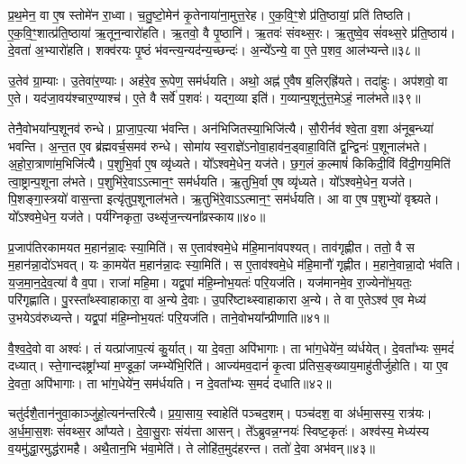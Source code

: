 प्र॒थ॒मेन॒ वा ए॒ष स्तोमे॑न रा॒ध्वा।
च॒तु॒ष्टो॒मेन॑ कृ॒तेनाया॑ना॒मुत्त॒रेह\sn{}।
ए॒क॒वि॒ꣳ॒शे प्र॑ति॒ष्ठायां॒ प्रति॑ तिष्ठति।
ए॒क॒वि॒ꣳ॒शात्प्र॑ति॒ष्ठाया॑ ऋ॒तून॒न्वारो॑हति।
ऋ॒तवो॒ वै पृ॒ष्ठानि॑।
ऋ॒तवः॑ संवथ्स॒रः।
ऋ॒तुष्वे॒व सं॑वथ्स॒रे प्र॑ति॒ष्ठाय॑।
दे॒वता॑ अ॒भ्यारो॑हति।
शक्व॑रयः पृ॒ष्ठं भ॑वन्त्य॒न्यद॑न्य॒च्छन्दः॑।
अ॒न्ये᳚\-ऽन्ये॒ वा ए॒ते प॒शव॒ आल॑भ्यन्ते॥३८॥

उ॒तेव॑ ग्रा॒म्याः।
उ॒तेवा॑र॒ण्याः।
अह॑रे॒व रू॒पेण॒ सम॑र्धयति।
अथो॒ अह्न॑ ए॒वैष ब॒लिर्‌\mbox{}ह्रि॑यते।
तदा॑हुः।
अप॑शवो॒ वा ए॒ते।
यद॑जा॒वय॑श्चार॒ण्याश्च॑।
ए॒ते वै सर्वे॑ प॒शवः॑।
यद्ग॒व्या इति॑।
ग॒व्यान्प॒शूनु॑त्त॒मेऽहं॒ नाल॑भते॥३९॥

तेनै॒वोभया᳚न्प॒शूनव॑ रुन्धे।
प्रा॒जा॒प॒त्या भ॑वन्ति।
अन॑भिजितस्या॒भिजि॑त्यै।
सौ॒रीर्नव॑ श्वे॒ता व॒शा अ॑नूब॒न्ध्या॑ भवन्ति।
अ॒न्त॒त ए॒व ब्र॑ह्मवर्च॒समव॑ रुन्धे।
सोमा॑य स्व॒राज्ञे॑\-ऽनोवा॒हाव॑न॒ड्वाहा॒विति॑ द्व॒न्द्विनः॑ प॒शूनाल॑भते।
अ॒हो॒रा॒त्राणा॑म॒भिजि॑त्यै।
प॒शुभि॒र्वा ए॒ष व्यृ॑ध्यते।
यो᳚ऽश्वमे॒धेन॒ यज॑ते।
छ॒ग॒लं क॒ल्माषं॑ किकिदी॒विं वि॑दी॒गय॒मिति॑ त्वा॒ष्ट्रान्प॒शूना ल॑भते।
प॒शुभि॑रे॒वाऽऽत्मान॒ꣳ॒ सम॑र्धयति।
ऋ॒तुभि॒र्वा ए॒ष व्यृ॑ध्यते।
यो᳚ऽश्वमे॒धेन॒ यज॑ते।
पि॒शङ्गा॒स्त्रयो॑ वास॒न्ता इत्यृ॑तुप॒शूनाल॑भते।
ऋ॒तुभि॑रे॒वाऽऽत्मान॒ꣳ॒ सम॑र्धयति।
आ वा ए॒ष प॒शुभ्यो॑ वृश्च्यते।
यो᳚ऽश्वमे॒धेन॒ यज॑ते।
पर्य॑ग्निकृता॒ उथ्सृ॑ज॒न्त्यना᳚व्रस्काय॥४०॥\anuvakamend[ल॒भ्य॒न्ते॒ ल॒भ॒ते॒ त्वा॒ष्ट्रान्प॒शूनाल॑भते॒\-ऽष्टौ च॑]

प्र॒जाप॑तिरकामयत म॒हान॑न्ना॒दः स्या॒मिति॑।
स ए॒ताव॑श्वमे॒धे म॑हि॒माना॑वपश्यत्।
ताव॑गृह्णीत।
ततो॒ वै स म॒हान॑न्ना॒दो॑\-ऽभवत्।
यः का॒मये॑त म॒हान॑न्ना॒दः स्या॒मिति॑।
स ए॒ताव॑श्वमे॒धे म॑हि॒मानौ॑ गृह्णीत।
म॒हाने॒वान्ना॒दो भ॑वति।
य॒ज॒मा॒न॒दे॒व॒त्या॑ वै व॒पा।
राजा॑ महि॒मा।
यद्व॒पां म॑हि॒म्नोभ॒यतः॑ परि॒यज॑ति।
यज॑मानमे॒व रा॒ज्येनो॑भ॒यतः॒ परि॑गृह्णाति।
पु॒रस्ता᳚थ्स्वाहाकारा॒ वा अ॒न्ये दे॒वाः।
उ॒परि॑ष्टाथ्स्वाहाकारा अ॒न्ये।
ते वा ए॒ते\-ऽश्व॑ ए॒व मेध्य॑ उ॒भये\-ऽव॑रुध्यन्ते।
यद्व॒पां म॑हि॒म्नोभ॒यतः॑ परि॒यज॑ति।
ताने॒वोभया᳚न्प्रीणाति॥४१॥\anuvakamend[प॒रि॒यज॑ति॒ षट्च॑]

वै॒श्व॒दे॒वो वा अश्वः॑।
तं यत्प्रा॑जाप॒त्यं कु॒र्यात्।
या दे॒वता॒ अपि॑भागाः।
ता भा॑ग॒धेये॑न॒ व्य॑र्धयेत्।
दे॒वता᳚भ्यः स॒मदं॑ दध्यात्।
स्ते॒गान्दꣴष्ट्रा᳚भ्यां म॒ण्डूकां॒ जम्भ्ये॑भि॒रिति॑।
आज्य॑मव॒दानं॑ कृ॒त्वा प्र॑तिस॒ङ्ख्याय॒माहु॑तीर्जुहोति।
या ए॒व दे॒वता॒ अपि॑भागाः।
ता भा॑ग॒धेये॑न॒ सम॑र्धयति।
न दे॒वता᳚भ्यः स॒मदं॑ दधाति॥४२॥

चतु॑र्दशै॒तान॑नुवा॒काञ्जु॑हो॒त्यन॑न्तरित्यै।
प्र॒या॒साय॒ स्वाहेति॑ पञ्चद॒शम्।
पञ्च॑दश॒ वा अ॑र्धमा॒सस्य॒ रात्र॑यः।
अ॒र्ध॒मा॒स॒शः सं॑वथ्स॒र आ᳚प्यते।
दे॒वा॒सु॒राः संय॑त्ता आसन्।
ते᳚ऽब्रुवन्न॒ग्नयः॑ स्विष्ट॒कृतः॑।
अश्व॑स्य॒ मेध्य॑स्य व॒यमु॑द्धा॒रमुद्ध॑रामहै।
अथै॒तान॒भि भ॑वा॒मेति॑।
ते लोहि॑त॒मुद॑हरन्त।
ततो॑ दे॒वा अभ॑वन्॥४३॥

